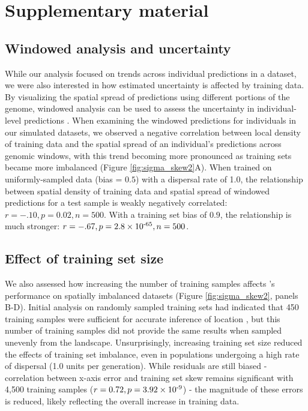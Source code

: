 \section*{Supplementary material}

\subsection*{Windowed analysis and uncertainty}

While our analysis focused on trends across individual predictions in a dataset, we were also interested in how estimated uncertainty is affected by training data.
By visualizing the spatial spread of predictions using different portions of the genome, windowed analysis can be used to assess the 
uncertainty in individual-level predictions \citep{battey2020locator}.
When examining the windowed predictions for individuals in our simulated datasets, we observed a negative correlation between local density of training data and 
the spatial spread of an individual's predictions across genomic windows, with this trend becoming more pronounced as training sets became more imbalanced (Figure \ref{fig:sigma_skew2}A).
When trained on uniformly-sampled data (bias = $0.5$) with a dispersal rate of 1.0, the relationship between spatial density of 
training data and spatial spread of windowed predictions for a test sample is weakly negatively correlated: $r = -.10, p = 0.02, n=500$. 
With a training set bias of $0.9$, the relationship is much stronger: $r = -.67, p = 2.8 \times 10\textsuperscript{-65}, n=500$.

\subsection*{Effect of training set size}
We also assessed how increasing the number of training samples affects \Locator's performance on spatially imbalanced datasets (Figure \ref{fig:sigma_skew2}, panels B-D). 
Initial analysis on randomly sampled training sets had indicated that 450 training samples were sufficient for accurate inference of location \citep{battey2020locator}, but this number of training samples did not provide the same results when sampled unevenly from the landscape. 
Unsurprisingly, increasing training set size reduced the effects of training set imbalance, even in populations undergoing a high rate of dispersal (1.0 units per generation). 
While residuals are still biased - correlation between x-axis error and training set skew remains significant with 4,500 training samples ($r = 0.72, p = 3.92 \times 10\textsuperscript{-9}$) - the magnitude of these errors is reduced, likely reflecting the overall increase in training data.


